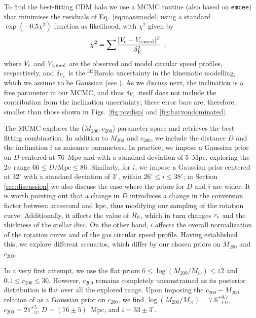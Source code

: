 \documentclass[fleqn,usenatbib]{mnras}
\begin{document}
To find the best-fitting CDM halo we use a MCMC routine (also based on \texttt{emcee}) that minimises the residuals of Eq.~\ref{eq:massmodel} using a standard $\exp(-0.5 \chi^2)$ function as likelihood, with $\chi^2$ given by
\begin{equation}
    \chi^2 = \Large{\sum} \dfrac{(V_{\rm c}-V_{\rm c,mod})^2}{\delta_{V_{\rm c}}^2}~,
\end{equation}
where $V_{\rm c}$ and $V_{\rm c,mod}$ are the observed and model circular speed profiles, respectively, and $\delta_{V_{\rm c}}$ is the $\mathrm{^{3D}}$Barolo uncertainty in the kinematic modelling, which we assume to be Gaussian (see \citealt{enrico_phd}). As we discuss next, the inclination is a free parameter in our MCMC, and thus $\delta_{V_{\rm c}}$ itself does not include the contribution from the inclination uncertainty; these error bars are, therefore, smaller than those shown in Figs.~\ref{fig:rcvdisp} and \ref{fig:baryondominated}.


The MCMC explores the ($M_{200}, c_{200}$) parameter space and retrieves the best-fitting combination. In addition to $M_{200}$ and $c_{200}$, we include the distance $D$ and the inclination $i$ as nuisance parameters. In practice, we impose a Gaussian prior on $D$ centered at 76~Mpc and with a standard deviation of 5~Mpc, exploring the $2\sigma$ range $66 \leq D/\textrm{Mpc} \leq 86$. Similarly, for $i$, we impose a Gaussian prior centered at $32^\circ$ with a standard deviation of $3^\circ$, within $26^\circ \leq i \leq 38^\circ$; in Section~ \ref{sec:discussion} we also discuss the case where the priors for $D$ and $i$ are wider. It is worth pointing out that a change in $D$ introduces a change in the conversion factor between arcsecond and kpc, thus modifying our sampling of the rotation curve. Additionally, it affects the value of $R_{\rm d}$, which in turn changes $r_{\rm c}$ and the thickness of the stellar disc. On the other hand, $i$ affects the overall normalization of the rotation curve and of the gas circular speed profile. Having established this, we explore different scenarios, which differ by our chosen priors on $M_{200}$ and $c_{200}$. 

In a very first attempt, we use the flat priors $6 \leq \log(M_{200}/M_\odot) \leq 12$ and $0.1 \leq c_{200} \leq 30$. However, $c_{200}$ remains completely unconstrained as its posterior distribution is flat over all the explored range. Upon imposing the $c_{200}-M_{200}$ relation of \citet{duttonmaccio2014} as a Gaussian prior on $c_{200}$, we find $\log(M_{200}/M_\odot) = 7.6^{+0.7}_{-1.0}$, $c_{200} = 21^{+5}_{-3}$, $D = (76 \pm 5)$~Mpc, and $i = 33\pm3^{\circ}$. 
\end{document}
